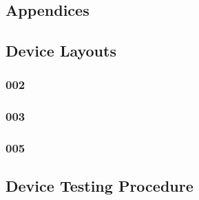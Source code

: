 \begin{appendix}

	\chapter{Appendices}					%
	
	
	\renewcommand{\thesection}{\Alph{section}}
	
 
\section{Device Layouts}
\subsection{002}
\subsection{003}
\subsection{005}

\section{Device Testing Procedure}
\label{app:testing}


\end{appendix}
